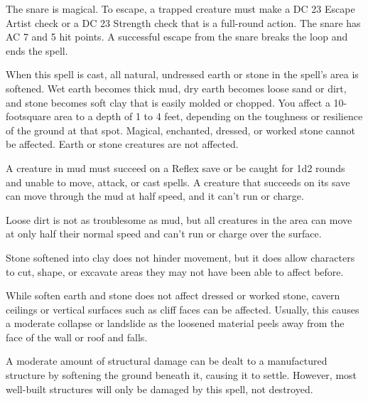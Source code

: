 \begin{multicols}{2}
\begin{small}
\smallskip\noindent The snare is magical. To escape, a trapped creature must make a DC 23 Escape Artist check or a DC 23 Strength check that is a full-round action. The snare has AC 7 and 5 hit points. A successful escape from the snare breaks the loop and ends the spell.

\noindent When this spell is cast, all natural, undressed earth or stone in the spell's area is softened. Wet earth becomes thick mud, dry earth becomes loose sand or dirt, and stone becomes soft clay that is easily molded or chopped. You affect a 10-footsquare area to a depth of 1 to 4 feet, depending on the toughness or resilience of the ground at that spot. Magical, enchanted, dressed, or worked stone cannot be affected. Earth or stone creatures are not affected.

\smallskip\noindent A creature in mud must succeed on a Reflex save or be caught for 1d2 rounds and unable to move, attack, or cast spells. A creature that succeeds on its save can move through the mud at half speed, and it can't run or charge.

\smallskip\noindent Loose dirt is not as troublesome as mud, but all creatures in the area can move at only half their normal speed and can't run or charge over the surface.

\smallskip\noindent Stone softened into clay does not hinder movement, but it does allow characters to cut, shape, or excavate areas they may not have been able to affect before.

\smallskip\noindent While soften earth and stone does not affect dressed or worked stone, cavern ceilings or vertical surfaces such as cliff faces can be affected. Usually, this causes a moderate collapse or landslide as the loosened material peels away from the face of the wall or roof and falls.

\smallskip\noindent A moderate amount of structural damage can be dealt to a manufactured structure by softening the ground beneath it, causing it to settle. However, most well-built structures will only be damaged by this spell, not destroyed.


\end{small}
\end{multicols}
